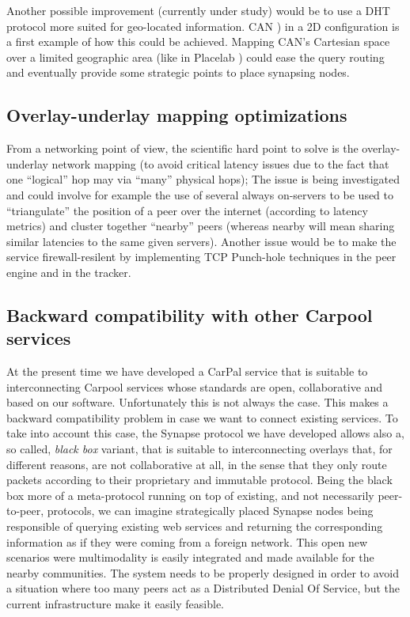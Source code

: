 Another possible improvement (currently under study) would be to use a
DHT protocol more suited for geo-located information. CAN \cite{CAN})
in a 2D configuration is a first example of how this could be
achieved. Mapping CAN's Cartesian space over a limited geographic area
(like in Placelab \cite{PlaceLab}) could ease the query routing and
eventually provide some strategic points to place synapsing nodes.

\subsection{Overlay-underlay mapping optimizations}
%
From a networking point of view, the scientific hard point to solve is
the overlay-underlay network mapping (to avoid critical latency issues
due to the fact that one ``logical'' hop may via ``many'' physical
hops); The issue is being investigated and could involve for example
the use of several always on-servers to be used to ``triangulate'' the
position of a peer over the internet (according to latency metrics)
and cluster together ``nearby'' peers (whereas nearby will mean sharing
similar latencies to the same given servers).  Another issue would be
to make the service firewall-resilent by implementing TCP Punch-hole
techniques in the peer engine and in the tracker.


\subsection{Backward compatibility with other Carpool services}
%
At the present time we have developed a CarPal service that is
suitable to interconnecting Carpool services whose standards are open,
collaborative and based on our software. Unfortunately this is not
always the case. This makes a backward compatibility problem in case
we want to connect existing services. To take into account this case,
the Synapse protocol we have developed allows also a, so called,
\emph{black box} variant, that is suitable to interconnecting overlays
that, for different reasons, are not collaborative at all, in the
sense that they only route packets according to their proprietary and
immutable protocol.  Being the black box more of a meta-protocol
running on top of existing, and not necessarily peer-to-peer,
protocols, we can imagine strategically placed Synapse nodes being
responsible of querying existing web services and returning the
corresponding information as if they were coming from a foreign
network. This open new scenarios were multimodality is easily
integrated and made available for the nearby communities. The system
needs to be properly designed in order to avoid a situation where too
many peers act as a Distributed Denial Of Service, but the current
infrastructure make it easily feasible.

